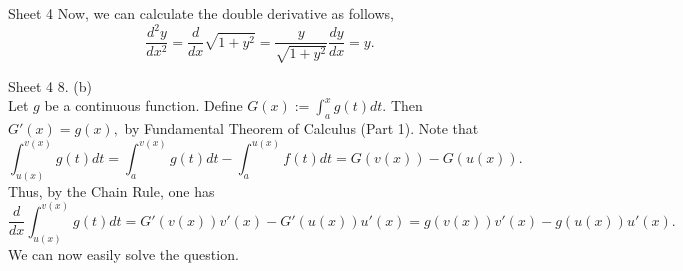 \documentclass[handout, aspectratio=169]{beamer}
\begin{document}
\begin{frame}{Sheet 4}
	Now, we can calculate the double derivative as follows,
	\[\frac{d^2y}{dx^2} = \frac{d}{dx}\sqrt{1 + y^2} = \dfrac{y}{\sqrt{1 + y^2}}\dfrac{dy}{dx} = y.\]
\end{frame}
\begin{frame}{Sheet 4}
	8. (b) \\
	Let $g$ be a continuous function. Define $G(x) := \displaystyle\int_{a}^{x} g(t) dt.$ Then $G'(x) = g(x),$ by Fundamental Theorem of Calculus (Part 1). Note that
	\[\int_{u(x)}^{v(x)} g(t) dt = \int_{a}^{v(x)} g(t) dt - \int_{a}^{u(x)} f(t) dt = G(v(x)) - G(u(x)).\]
	Thus, by the Chain Rule, one has
	\[\dfrac{d}{dx}\int_{u(x)}^{v(x)} g(t) dt = G'(v(x))v'(x) - G'(u(x))u'(x) = g(v(x))v'(x) - g(u(x))u'(x).\]
	We can now easily solve the question.
\end{frame}
	
\end{document}
